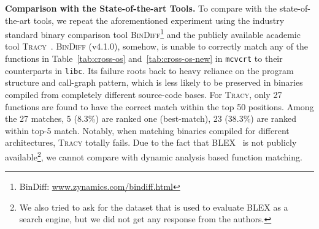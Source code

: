 

\noindent\textbf{Comparison with the State-of-the-art Tools.} To compare \toolNew with the state-of-the-art tools, we repeat the aforementioned experiment using the industry standard binary comparison tool \textsc{\small BinDiff}\footnote{BinDiff: \url{www.zynamics.com/bindiff.html}} and the publicly available academic tool \textsc{\small Tracy}~\cite{DBLP:conf/pldi/DavidY14}. \textsc{\small BinDiff} (v4.1.0), somehow, is unable to correctly match any of the  functions in Table~\ref{tab:cross-os} and~\ref{tab:cross-os-new} in \texttt{mcvcrt} to their counterparts in \texttt{libc}. Its failure roots back to heavy reliance on the program structure and call-graph pattern, which is less likely to be preserved in binaries compiled from completely different source-code bases. For \textsc{\small Tracy}, only 27 functions are found to have the correct match within the top 50 positions. Among the 27 matches,
5 (8.3\%) are ranked one (best-match), 23 (38.3\%) are ranked within top-5 match. %
Notably, when matching binaries compiled for different architectures, \textsc{\small Tracy} totally fails.
Due to the fact that BLEX~\cite{egele2014blanket} is not publicly available\footnote{We also tried to ask for the dataset that is used to evaluate  \textsc{\small BLEX} as a search engine, but we did not get any response from the authors.}, %
we cannot compare \toolNew with dynamic analysis based function matching.


